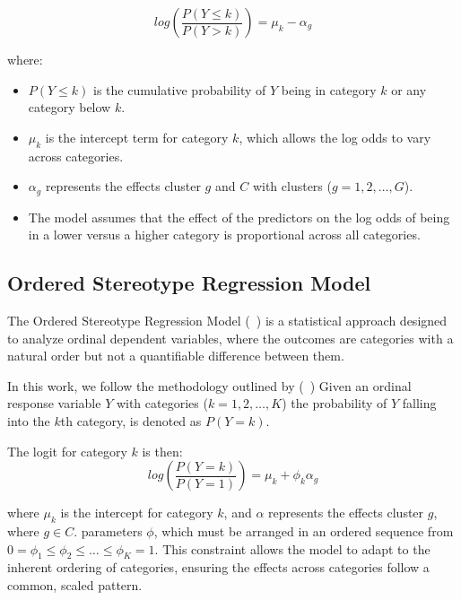 \documentclass{article}
\begin{document}
\begin{equation}
log\left(\frac{P(Y \leq k)}{P(Y > k)}\right) = \mu_k - \alpha_g
\end{equation}

where:
\begin{itemize}
    \item $P(Y \leq k)$ is the cumulative probability of $Y$ being in category $k$ or any category below $k$.
    \item $\mu_k$ is the intercept term for category $k$, which allows the log odds to vary across categories.
    \item $\alpha_g$ represents the effects cluster $g$ and $C$ with clusters ({$g=1, 2, \ldots, G$}).
    \item The model assumes that the effect of the predictors on the log odds of being in a lower versus a higher category is proportional across all categories.
\end{itemize}

\subsection{Ordered Stereotype Regression Model}

The Ordered Stereotype Regression Model  (~\cite{anderson1984regression}) is a statistical approach designed to analyze ordinal dependent variables, where the outcomes are categories with a natural order but not a quantifiable difference between them.

In this work, we follow the methodology outlined by (~\cite{fernandez2016mixture})
Given an ordinal response variable $Y$ with categories ($k=1, 2, \ldots, K$) the probability of $Y$ falling into the $k$th category, is denoted as $P(Y = k)$.


The logit for category $k$ is then:
\begin{equation}
log\left(\frac{P(Y = k)}{P(Y = 1)}\right) = \mu_k + \phi_k \alpha_g
\end{equation}

where $\mu_k$ is the intercept for category $k$, 
and $\alpha$ represents the effects cluster $g$, where $g \in C$.
parameters $\phi$, which must be arranged in an ordered sequence from 
$0 = \phi_1 \leq \phi_2 \leq \ldots \leq \phi_K = 1.$ 
This constraint allows the model to adapt to the inherent ordering of categories, ensuring the effects across categories follow a common, scaled pattern.

\end{document}
